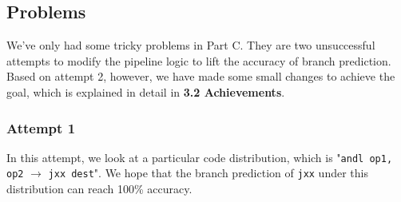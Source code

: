 \documentclass[12pt,a4paper]{article}
\begin{document}
\subsection{Problems}
We've only had some tricky problems in Part C. They are two unsuccessful attempts to modify the pipeline logic to lift the accuracy of branch prediction.
Based on attempt 2, however, we have made some small changes to achieve the goal, which is explained in detail in \textbf{3.2 Achievements}.
\subsubsection{Attempt 1}
In this attempt, we look at a particular code distribution, 
which is "\texttt{andl op1, op2} $\rightarrow$ \texttt{jxx dest}". 
We hope that the branch prediction of \texttt{jxx} under this distribution can reach 100\% accuracy.
\end{document}
